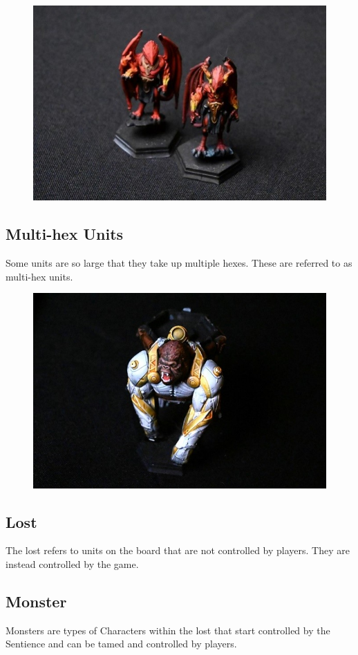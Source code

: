 \documentclass[../main.tex]{subfiles}
\begin{document}
\begin{figure}[h]
    \centering
    \includegraphics[width=0.75\linewidth]{chapters//Settingupacharactercard/TimeStrikeMultiunitMinis.jpg}
\end{figure}

\subsection{Multi-hex Units}
Some units are so large that they take up multiple hexes. These are referred to as multi-hex units. 
\begin{figure}[h]
    \centering
    \includegraphics[width=0.75\linewidth]{chapters//Settingupacharactercard/TimeStrikeMultihexmini.jpeg}
\end{figure}

\subsection{Lost}
The lost refers to units on the board that are not controlled by players. They are instead controlled by the game. 


\subsection{Monster}
Monsters are types of Characters within the lost that start controlled by the Sentience and can be tamed and controlled by players. 
\end{document}
